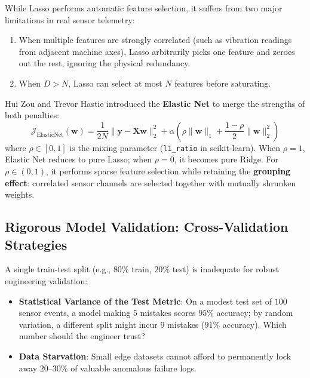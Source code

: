 While Lasso performs automatic feature selection, it suffers from two major limitations in real sensor telemetry:
\begin{enumerate}
    \item When multiple features are strongly correlated (such as vibration readings from adjacent machine axes), Lasso arbitrarily picks one feature and zeroes out the rest, ignoring the physical redundancy.
    \item When $D > N$, Lasso can select at most $N$ features before saturating.
\end{enumerate}
Hui Zou and Trevor Hastie introduced the \textbf{Elastic Net} to merge the strengths of both penalties:
\begin{equation}
\mathcal{J}_{\text{ElasticNet}}(\mathbf{w}) = \frac{1}{2N}\|\mathbf{y} - \mathbf{X}\mathbf{w}\|_2^2 + \alpha \left( \rho \|\mathbf{w}\|_1 + \frac{1 - \rho}{2} \|\mathbf{w}\|_2^2 \right)\label{eq:elastic_net}
\end{equation}
where $\rho \in [0, 1]$ is the mixing parameter (\texttt{l1\_ratio} in scikit-learn). When $\rho = 1$, Elastic Net reduces to pure Lasso; when $\rho = 0$, it becomes pure Ridge. For $\rho \in (0, 1)$, it performs sparse feature selection while retaining the \textbf{grouping effect}: correlated sensor channels are selected together with mutually shrunken weights.

\subsection{Rigorous Model Validation: Cross-Validation Strategies}\label{subsec:cross_validation}

A single train-test split (e.g., $80\%$ train, $20\%$ test) is inadequate for robust engineering validation:
\begin{itemize}
    \item \textbf{Statistical Variance of the Test Metric}: On a modest test set of $100$ sensor events, a model making $5$ mistakes scores $95\%$ accuracy; by random variation, a different split might incur $9$ mistakes ($91\%$ accuracy). Which number should the engineer trust?
    \item \textbf{Data Starvation}: Small edge datasets cannot afford to permanently lock away $20\text{--}30\%$ of valuable anomalous failure logs.
\end{itemize}

